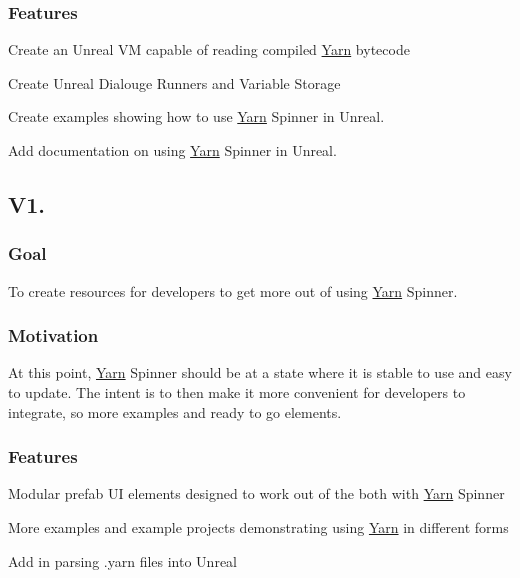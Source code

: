 \subsubsection*{Features}


\begin{DoxyItemize}
\item Create an Unreal V\-M capable of reading compiled \hyperlink{a00050}{Yarn} bytecode
\item Create Unreal Dialouge Runners and Variable Storage
\item Create examples showing how to use \hyperlink{a00050}{Yarn} Spinner in Unreal.
\item Add documentation on using \hyperlink{a00050}{Yarn} Spinner in Unreal.
\end{DoxyItemize}

\subsection*{V1.}

\subsubsection*{Goal}

To create resources for developers to get more out of using \hyperlink{a00050}{Yarn} Spinner.

\subsubsection*{Motivation}

At this point, \hyperlink{a00050}{Yarn} Spinner should be at a state where it is stable to use and easy to update. The intent is to then make it more convenient for developers to integrate, so more examples and ready to go elements.

\subsubsection*{Features}


\begin{DoxyItemize}
\item Modular prefab U\-I elements designed to work out of the both with \hyperlink{a00050}{Yarn} Spinner
\item More examples and example projects demonstrating using \hyperlink{a00050}{Yarn} in different forms
\item Add in parsing {\ttfamily .yarn} files into Unreal
\end{DoxyItemize}

